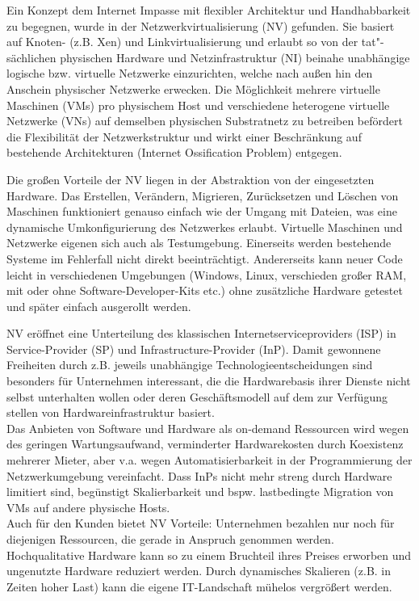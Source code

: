 Ein Konzept dem Internet Impasse mit flexibler Architektur und Handhabbarkeit zu begegnen, wurde in der Netzwerkvirtualisierung (NV) gefunden. \cite{anderson2005overcoming, bays2012security, fischer2013virtual} Sie basiert auf Knoten- (z.B. Xen) und Linkvirtualisierung und erlaubt so von der tat"-sächlichen physischen Hardware und Netzinfrastruktur (NI) beinahe unabhängige logische bzw. virtuelle Netzwerke einzurichten, welche nach außen hin den Anschein physischer Netzwerke erwecken. Die Möglichkeit mehrere virtuelle Maschinen (VMs) pro physischem Host und verschiedene heterogene virtuelle Netzwerke (VNs) auf demselben physischen Substratnetz zu betreiben befördert die Flexibilität der Netzwerkstruktur und wirkt einer Beschränkung auf bestehende Architekturen (Internet Ossification Problem) entgegen. \cite{anderson2005overcoming}

Die großen Vorteile der NV liegen in der Abstraktion von der eingesetzten Hardware. Das Erstellen, Verändern, Migrieren, Zurücksetzen und Löschen von Maschinen funktioniert genauso einfach wie der Umgang mit Dateien, was eine dynamische Umkonfigurierung des Netzwerkes erlaubt. Virtuelle Maschinen und Netzwerke eigenen sich auch als Testumgebung. Einerseits werden bestehende Systeme im Fehlerfall nicht direkt beeinträchtigt. Andererseits kann neuer Code leicht in verschiedenen Umgebungen (Windows, Linux, verschieden großer RAM, mit oder ohne Software-Developer-Kits etc.) ohne zusätzliche Hardware getestet und später einfach ausgerollt werden.

NV eröffnet eine Unterteilung des klassischen Internetserviceproviders (ISP) in Service-Provider (SP) und Infrastructure-Provider (InP). Damit gewonnene Freiheiten durch z.B. jeweils unabhängige Technologieentscheidungen sind besonders für Unternehmen interessant, die die Hardwarebasis ihrer Dienste nicht selbst unterhalten wollen oder deren Geschäftsmodell auf dem zur Verfügung stellen von Hardwareinfrastruktur basiert. \cite{wang2016towards}\\
Das Anbieten von Software und Hardware als on-demand Ressourcen wird wegen des geringen Wartungsaufwand, verminderter Hardwarekosten durch Koexistenz mehrerer Mieter, aber v.a. wegen Automatisierbarkeit in der Programmierung der Netzwerkumgebung vereinfacht. Dass InPs nicht mehr streng durch Hardware limitiert sind, begünstigt Skalierbarkeit und bspw. lastbedingte Migration von VMs auf andere physische Hosts.\\
Auch für den Kunden bietet NV Vorteile: Unternehmen bezahlen nur noch für diejenigen Ressourcen, die gerade in Anspruch genommen werden. Hochqualitative Hardware kann so zu einem Bruchteil ihres Preises erworben und ungenutzte Hardware reduziert werden. Durch dynamisches Skalieren (z.B. in Zeiten hoher Last) kann die eigene IT-Landschaft mühelos vergrößert werden.

